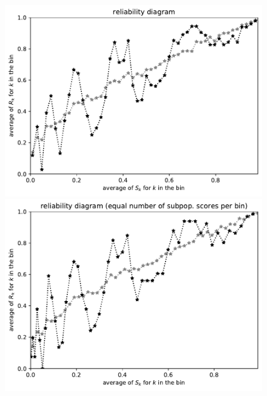 \documentclass{article}
\begin{document}
\begin{figure}
\begin{centering}
\parbox{\imsize}{\includegraphics[width=\imsize]
                {./codes/unweighted/50000_3300_50_2/equiscore.pdf}}
\quad\quad
\parbox{\imsize}{\includegraphics[width=\imsize]
                {./codes/unweighted/50000_3300_50_2/equisamps.pdf}}


\end{centering}
\end{figure}
\end{document}
